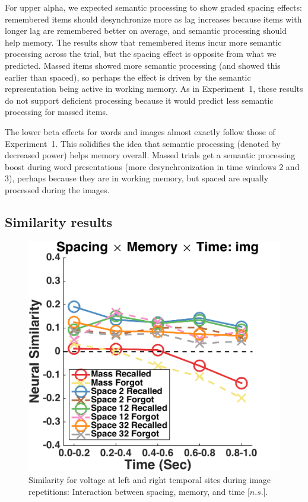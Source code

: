 For upper alpha,
we expected semantic processing to show graded spacing effects: remembered items should desynchronize more as lag increases because items with longer lag are remembered better on average, and semantic processing should help memory.  The results show that remembered items incur more semantic processing across the trial, but the spacing effect is opposite from what we predicted.  Massed items showed more semantic processing (and showed this earlier than spaced), so perhaps the effect is driven by the semantic representation being active in working memory.  As in Experiment~1, these results do not support deficient processing because it would predict less semantic processing for massed items.

The lower beta effects for words and images almost exactly follow those of Experiment~1.  This solidifies the idea that semantic processing (denoted by decreased power) helps memory overall.  Massed trials get a semantic processing boost during word presentations (more desynchronization in time windows 2 and 3), perhaps because they are in working memory, but spaced are equally processed during the images.

\subsection{Similarity results}

\begin{figure}[H]
  \centering
  \includegraphics[width=.40\textwidth]{./figs/exp2/similarity_spacXmemXtime_img_tla_LTRT_0to200_200to400_400to600_600to800_800to1000_kaiser_cosine}
  \caption{Similarity for voltage at left and right temporal sites during image repetitions: Interaction between spacing, memory, and time [$n.s.$].}
  \label{fig:s2_sim_tla_spacXmemXtime}
\end{figure}

